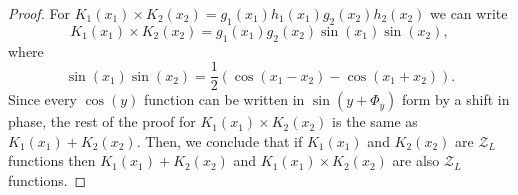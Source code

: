 \begin{proof}
For $ K_1(x_1)\times K_2(x_2)=g_1(x_1)h_1(x_1)g_2(x_2)h_2(x_2)$ we can write
\begin{equation}
    K_1(x_1)\times K_2(x_2)=g_1(x_1)g_2(x_2)\sin{(x_1)}\sin{(x_2)},
\end{equation}
where 
\begin{equation}
    \sin{(x_1)}\sin{(x_2)}=\frac{1}{2}\left(\cos{(x_1-x_2)}-\cos{(x_1+x_2)}\right).
\end{equation}
Since every $\cos(y)$ function can be written in $\sin(y+\Phi_y)$ form by a shift in phase, the rest of the proof for $K_1(x_1)\times K_2(x_2)$ is the same as $K_1(x_1)+ K_2(x_2)$. Then, we conclude that if $K_1(x_1)$ and $K_2(x_2)$ are $\mathcal{Z}_L$ functions then $K_1(x_1)+ K_2(x_2)$ and $K_1(x_1)\times K_2(x_2)$ are also $\mathcal{Z}_L$ functions.
\end{proof}